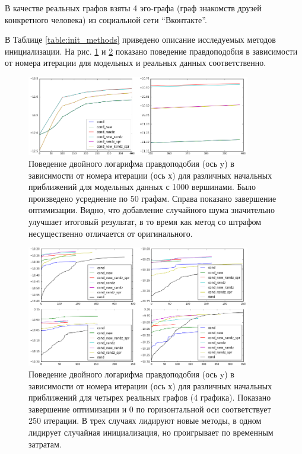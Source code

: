 \documentclass{ITaSconf}
\begin{document}
	В качестве реальных графов взяты 4 эго-графа (граф знакомств друзей конкретного человека) из социальной сети ``Вконтакте''.
	
	В Таблице \ref{table:init_methods} приведено описание исследуемых методов инициализации.
	На рис. \ref{fig:llh_init_model} и \ref{fig:llh_init_real} показано поведение правдоподобия в зависимости от номера итерации для модельных и реальных данных соответственно.
	
	\begin{figure}[!t]
		\centering
		\includegraphics[width=0.87\textwidth]{imgs/init_new_good.png}
		\caption{Поведение двойного логарифма правдоподобия (ось y) в зависимости от номера итерации (ось х) для различных начальных приближений для модельных данных \cite{lancichinetti2009benchmarks} с 1000 вершинами. Было произведено усреднение по 50 графам. Справа показано завершение оптимизации. Видно, что добавление случайного шума значительно улучшает итоговый результат, в то время как метод со штрафом несущественно отличается от оригинального.}
		\label{fig:llh_init_model}
	\end{figure}
	\begin{figure}[!h]
		\centering
		\includegraphics[width=0.87\textwidth]{imgs/init_llh_real.png}
		\caption{Поведение двойного логарифма правдоподобия (ось y) в зависимости от номера итерации (ось х) для различных начальных приближений для четырех реальных графов (4 графика). Показано завершение оптимизации и 0 по горизонтальной оси соответствует 250 итерации. В трех случаях лидируют новые методы, в одном лидирует случайная инициализация, но проигрывает по временным затратам. }
		\label{fig:llh_init_real}
	\end{figure}
\end{document}
